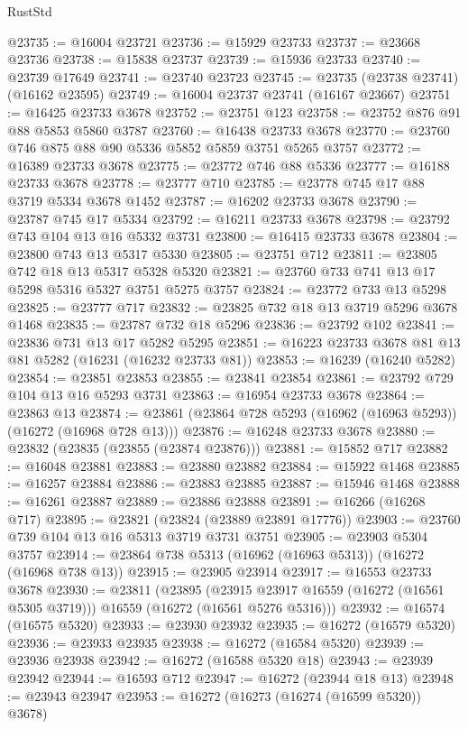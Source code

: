 \begin{lexlean}{RustStd}
\begin{coremodule}
@23735 := @16004 @23721
@23736 := @15929 @23733
@23737 := @23668 @23736
@23738 := @15838 @23737
@23739 := @15936 @23733
@23740 := @23739 @17649
@23741 := @23740 @23723
@23745 := @23735 (@23738 @23741) (@16162 @23595)
@23749 := @16004 @23737 @23741 (@16167 @23667)
@23751 := @16425 @23733 @3678
@23752 := @23751 @123
@23758 := @23752 @876 @91 @88 @5853 @5860 @3787
@23760 := @16438 @23733 @3678
@23770 := @23760 @746 @875 @88 @90 @5336 @5852 @5859 @3751 @5265 @3757
@23772 := @16389 @23733 @3678
@23775 := @23772 @746 @88 @5336
@23777 := @16188 @23733 @3678
@23778 := @23777 @710
@23785 := @23778 @745 @17 @88 @3719 @5334 @3678 @1452
@23787 := @16202 @23733 @3678
@23790 := @23787 @745 @17 @5334
@23792 := @16211 @23733 @3678
@23798 := @23792 @743 @104 @13 @16 @5332 @3731
@23800 := @16415 @23733 @3678
@23804 := @23800 @743 @13 @5317 @5330
@23805 := @23751 @712
@23811 := @23805 @742 @18 @13 @5317 @5328 @5320
@23821 := @23760 @733 @741 @13 @17 @5298 @5316 @5327 @3751 @5275 @3757
@23824 := @23772 @733 @13 @5298
@23825 := @23777 @717
@23832 := @23825 @732 @18 @13 @3719 @5296 @3678 @1468
@23835 := @23787 @732 @18 @5296
@23836 := @23792 @102
@23841 := @23836 @731 @13 @17 @5282 @5295
@23851 := @16223 @23733 @3678 @81 @13 @81 @5282 (@16231 (@16232 @23733 @81))
@23853 := @16239 (@16240 @5282)
@23854 := @23851 @23853
@23855 := @23841 @23854
@23861 := @23792 @729 @104 @13 @16 @5293 @3731
@23863 := @16954 @23733 @3678
@23864 := @23863 @13
@23874 := @23861 (@23864 @728 @5293 (@16962 (@16963 @5293)) (@16272 (@16968 @728 @13)))
@23876 := @16248 @23733 @3678
@23880 := @23832 (@23835 (@23855 (@23874 @23876)))
@23881 := @15852 @717
@23882 := @16048 @23881
@23883 := @23880 @23882
@23884 := @15922 @1468
@23885 := @16257 @23884
@23886 := @23883 @23885
@23887 := @15946 @1468
@23888 := @16261 @23887
@23889 := @23886 @23888
@23891 := @16266 (@16268 @717)
@23895 := @23821 (@23824 (@23889 @23891 @17776))
@23903 := @23760 @739 @104 @13 @16 @5313 @3719 @3731 @3751
@23905 := @23903 @5304 @3757
@23914 := @23864 @738 @5313 (@16962 (@16963 @5313)) (@16272 (@16968 @738 @13))
@23915 := @23905 @23914
@23917 := @16553 @23733 @3678
@23930 := @23811
    (@23895
      (@23915 @23917 @16559 (@16272 (@16561 @5305 @3719)))
      @16559
      (@16272 (@16561 @5276 @5316)))
@23932 := @16574 (@16575 @5320)
@23933 := @23930 @23932
@23935 := @16272 (@16579 @5320)
@23936 := @23933 @23935
@23938 := @16272 (@16584 @5320)
@23939 := @23936 @23938
@23942 := @16272 (@16588 @5320 @18)
@23943 := @23939 @23942
@23944 := @16593 @712
@23947 := @16272 (@23944 @18 @13)
@23948 := @23943 @23947
@23953 := @16272 (@16273 (@16274 (@16599 @5320)) @3678)

\end{coremodule}
\end{lexlean}
